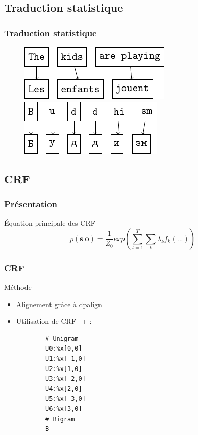 \documentclass{beamer}
\begin{document}
\subsection{Traduction statistique}
\begin{frame}
\tableofcontents[currentsection]
\end{frame}
\begin{frame}
    \frametitle{Traduction statistique}
    \begin{figure}[H]
        \label{translation_alignment}
        \centering
        \vspace{0.3cm}
        \includegraphics{word_alignment.pdf}
        \hspace{0.5cm}
        \includegraphics{letter_alignment.pdf}
    \end{figure}
\end{frame}

\subsection{CRF}

\begin{frame}
\frametitle{Présentation}
\begin{block}{Équation principale des CRF}
\begin{equation}
p(\textbf{s}|\textbf{o}) = \frac{1}{Z_0}exp(\sum_{t=1}^T\sum_k \lambda_k f_k(...))
\label{eqcrf}
\end{equation}
\end{block}
\end{frame}

\begin{frame}[fragile]
\frametitle{CRF}
	\begin{block}{Méthode}
		\begin{itemize}
		\item Alignement grâce à dpalign
		\item Utilisation de CRF++ :
		{\scriptsize \begin{verbatim}
		# Unigram
		U0:%x[0,0]
		U1:%x[-1,0]
		U2:%x[1,0]
		U3:%x[-2,0]
		U4:%x[2,0]
		U5:%x[-3,0]
		U6:%x[3,0]
		# Bigram
		B
		\end{verbatim}}
		\end{itemize}
	\end{block}
\end{frame}
\end{document}
